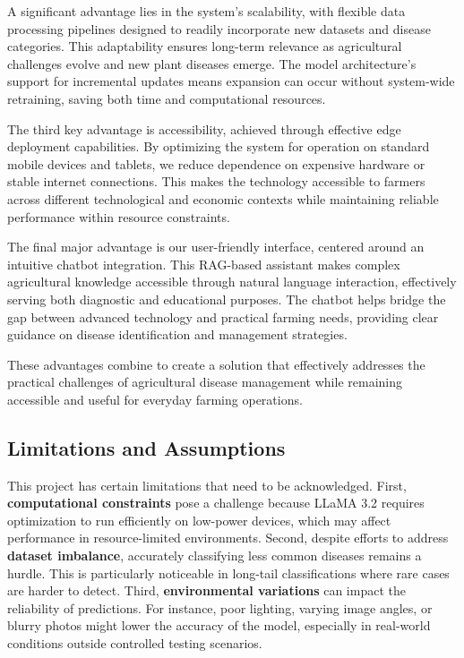 A significant advantage lies in the system's scalability, with flexible data processing pipelines designed to readily incorporate new datasets and disease categories. This adaptability ensures long-term relevance as agricultural challenges evolve and new plant diseases emerge. The model architecture's support for incremental updates means expansion can occur without system-wide retraining, saving both time and computational resources.

The third key advantage is accessibility, achieved through effective edge deployment capabilities. By optimizing the system for operation on standard mobile devices and tablets, we reduce dependence on expensive hardware or stable internet connections. This makes the technology accessible to farmers across different technological and economic contexts while maintaining reliable performance within resource constraints.

The final major advantage is our user-friendly interface, centered around an intuitive chatbot integration. This RAG-based assistant makes complex agricultural knowledge accessible through natural language interaction, effectively serving both diagnostic and educational purposes. The chatbot helps bridge the gap between advanced technology and practical farming needs, providing clear guidance on disease identification and management strategies.

These advantages combine to create a solution that effectively addresses the practical challenges of agricultural disease management while remaining accessible and useful for everyday farming operations.
 

\subsection{Limitations and Assumptions}

This project has certain limitations that need to be acknowledged. First, \textbf{computational constraints} pose a challenge because LLaMA 3.2 requires optimization to run efficiently on low-power devices, which may affect performance in resource-limited environments. Second, despite efforts to address \textbf{dataset imbalance}, accurately classifying less common diseases remains a hurdle. This is particularly noticeable in long-tail classifications where rare cases are harder to detect. Third, \textbf{environmental variations} can impact the reliability of predictions. For instance, poor lighting, varying image angles, or blurry photos might lower the accuracy of the model, especially in real-world conditions outside controlled testing scenarios. 

